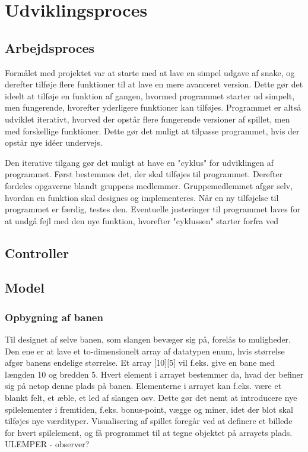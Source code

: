 \documentclass{report}
\begin{document}
\section{Udviklingsproces}
\subsection{Arbejdsproces}
Formålet med projektet var at starte med at lave en simpel udgave af snake, og derefter tilføje flere funktioner til at lave en mere avanceret version. Dette gør det ideelt at tilføje en funktion af gangen, hvormed programmet starter ud simpelt, men fungerende, hvorefter yderligere funktioner kan tilføjes. Programmet er altså udviklet iterativt, hvorved der opstår flere fungerende versioner af spillet, men med forskellige funktioner. Dette gør det muligt at tilpasse programmet, hvis der opstår nye idéer undervejs. 

Den iterative tilgang gør det muligt at have en "cyklus" for udviklingen af programmet. Først bestemmes det, der skal tilføjes til programmet. Derefter fordeles opgaverne blandt gruppens medlemmer. Gruppemedlemmet afgør selv, hvordan en funktion skal designes og implementeres. Når en ny tilføjelse til programmet er færdig, testes den. Eventuelle justeringer til programmet laves for at undgå fejl med den nye funktion, hvorefter "cyklussen" starter forfra ved

\subsection{Controller}
	
\subsection{Model}

\subsubsection{Opbygning af banen}
Til designet af selve banen, som slangen bevæger sig på, forelås to muligheder. Den ene er at lave et to-dimensionelt array af datatypen enum, hvis størrelse afgør banens endelige størrelse. Et array [10][5] vil f.eks. give en bane med længden 10 og bredden 5. Hvert element i arrayet bestemmer da, hvad der befiner sig på netop denne plads på banen. Elementerne i arrayet kan f.eks. være et blankt felt, et æble, et led af slangen osv. Dette gør det nemt at introducere nye spilelementer i fremtiden, f.eks. bonus-point, vægge og miner, idet der blot skal tilføjes nye værdityper. Visualisering af spillet foregår ved at definere et billede for hvert spilelement, og få programmet til at tegne objektet på arrayets plads.
ULEMPER - observer?
\end{document}
